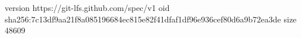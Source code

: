 version https://git-lfs.github.com/spec/v1
oid sha256:7c13df9aa21f8a085196684ec815e82f41dfaf1df96e936cef80d6a9b72ea3de
size 48609
